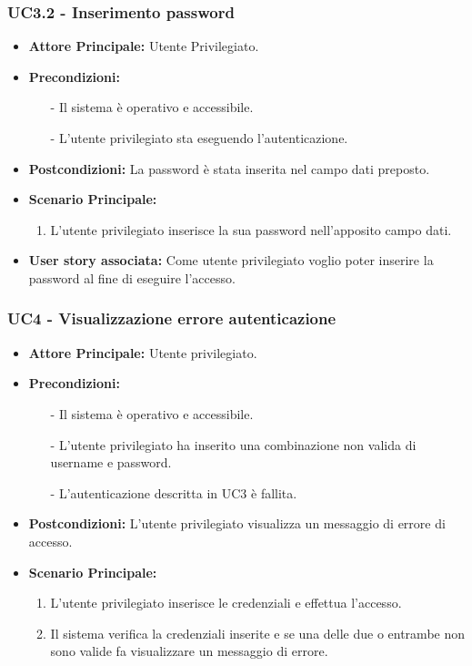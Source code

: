 \documentclass[11pt]{article}
\begin{document}
\begin{justify}
\subsubsection{\textbf{UC3.2 - Inserimento password}}
\begin{itemize}
     \item \textbf{Attore Principale:} Utente Privilegiato.
     \item \textbf{Precondizioni:} 
            \begin{itemize}
                \item [-] Il sistema è operativo e accessibile.
                \item [-] L'utente privilegiato sta eseguendo l'autenticazione.
            \end{itemize}
     \item \textbf{Postcondizioni:} La password è stata inserita nel campo dati preposto.
     \item \textbf{Scenario Principale:}
     \begin{enumerate}
         \item L'utente privilegiato inserisce la sua password nell'apposito campo dati.
     \end{enumerate}
     \item \textbf{User story associata:} Come utente privilegiato voglio poter inserire la password al fine di 
     eseguire l'accesso.
\end{itemize}

\subsubsection{\textbf{UC4 - Visualizzazione errore autenticazione}}
\begin{itemize}
    \item \textbf{Attore Principale:} Utente privilegiato.
    \item \textbf{Precondizioni:}
            \begin{itemize}
                \item [-] Il sistema è operativo e accessibile.
                \item [-] L'utente privilegiato ha inserito una combinazione non valida di username e password.
                \item [-] L'autenticazione descritta in UC3 è fallita.
            \end{itemize}
    \item \textbf{Postcondizioni:} L'utente privilegiato visualizza un messaggio di errore di accesso.
    \item \textbf{Scenario Principale:}
            \begin{enumerate}
                \item L'utente privilegiato inserisce le credenziali e effettua l'accesso.
                \item Il sistema verifica la credenziali inserite e se una delle due o entrambe non sono valide fa 
                visualizzare un messaggio di errore.
            \end{enumerate}
\end{itemize}



\end{justify}
\end{document}

